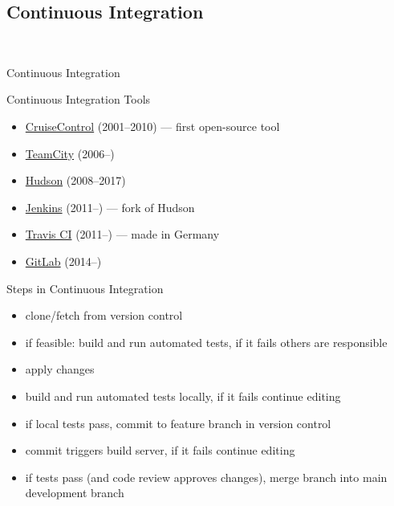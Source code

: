 \subsection{Continuous Integration}
\begin{frame}{\insertsubsection\ \mytitlesource{\sommerville}}
	\begin{fancycolumns}
		\begin{note}{Continuous Integration}
		\end{note}
		\begin{definition}{Continuous Integration Tools}
			\begin{itemize}
				\item \href{https://en.wikipedia.org/wiki/CruiseControl}{CruiseControl} (2001--2010) --- first open-source tool
				\item \href{https://en.wikipedia.org/wiki/TeamCity}{TeamCity} (2006--)
				\item \href{https://en.wikipedia.org/wiki/Hudson_(software)}{Hudson} (2008--2017)
				\item \href{https://en.wikipedia.org/wiki/Jenkins_(software)}{Jenkins} (2011--) --- fork of Hudson
				\item \href{https://en.wikipedia.org/wiki/Travis_CI}{Travis CI} (2011--) --- made in Germany
				\item \href{https://en.wikipedia.org/wiki/GitLab}{GitLab} (2014--)
			\end{itemize}
		\end{definition}
		\nextcolumn
		\begin{definition}{Steps in Continuous Integration}
			\begin{itemize}
				\item clone/fetch from version control
				\item if feasible: build and run automated tests, if it fails others are responsible
				\item apply changes
				\item build and run automated tests locally, if it fails continue editing
				\item if local tests pass, commit to feature branch in version control
				\item commit triggers build server, if it fails continue editing
				\item if tests pass (and code review approves changes), merge branch into main development branch
			\end{itemize}
		\end{definition}
	\end{fancycolumns}
\end{frame}

